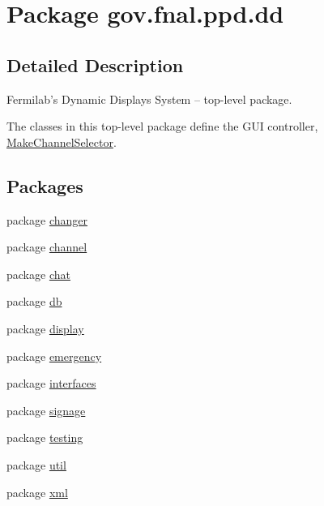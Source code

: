 \hypertarget{namespacegov_1_1fnal_1_1ppd_1_1dd}{\section{Package gov.\-fnal.\-ppd.\-dd}
\label{namespacegov_1_1fnal_1_1ppd_1_1dd}
}


\subsection{Detailed Description}
Fermilab's Dynamic Displays System -- top-\/level package.

The classes in this top-\/level package define the G\-U\-I controller, \hyperlink{classgov_1_1fnal_1_1ppd_1_1dd_1_1MakeChannelSelector}{Make\-Channel\-Selector}.\subsection*{Packages}
\begin{DoxyCompactItemize}
\item 
package \hyperlink{namespacegov_1_1fnal_1_1ppd_1_1dd_1_1changer}{changer}
\item 
package \hyperlink{namespacegov_1_1fnal_1_1ppd_1_1dd_1_1channel}{channel}
\item 
package \hyperlink{namespacegov_1_1fnal_1_1ppd_1_1dd_1_1chat}{chat}
\item 
package \hyperlink{namespacegov_1_1fnal_1_1ppd_1_1dd_1_1db}{db}
\item 
package \hyperlink{namespacegov_1_1fnal_1_1ppd_1_1dd_1_1display}{display}
\item 
package \hyperlink{namespacegov_1_1fnal_1_1ppd_1_1dd_1_1emergency}{emergency}
\item 
package \hyperlink{namespacegov_1_1fnal_1_1ppd_1_1dd_1_1interfaces}{interfaces}
\item 
package \hyperlink{namespacegov_1_1fnal_1_1ppd_1_1dd_1_1signage}{signage}
\item 
package \hyperlink{namespacegov_1_1fnal_1_1ppd_1_1dd_1_1testing}{testing}
\item 
package \hyperlink{namespacegov_1_1fnal_1_1ppd_1_1dd_1_1util}{util}
\item 
package \hyperlink{namespacegov_1_1fnal_1_1ppd_1_1dd_1_1xml}{xml}
\end{DoxyCompactItemize}
